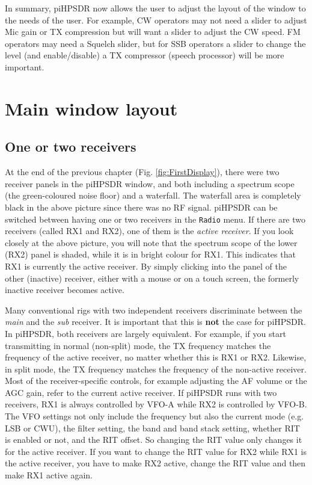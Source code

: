 \documentclass[12pt]{book}
\def\bltt#1{\texttt{\color{blue}#1}}
\def\pH{pi\-HPSDR\xspace}
\begin{document}
In summary, \pH now allows the user to adjust the layout of the window to the needs of the user.
For example, CW operators
may not need a slider to adjust Mic gain or TX compression but will want a slider to adjust the CW
speed. FM operators may need a Squelch slider, but for SSB operators a slider to change the
level (and enable/disable) a TX compressor (speech processor) will be more important.

\chapter{Main window layout}

\section{One or two receivers}
At the end of the previous chapter (Fig. \ref{fig:FirstDisplay}),
there were two receiver panels in the
\pH window, and both including a spectrum scope
(the green-coloured noise floor) and a waterfall. The waterfall area
is completely black in the above picture since there was no RF signal.
\pH can be switched between having one or two receivers in the
\bltt{Radio} menu. If there are two receivers (called RX1 and RX2),
one of them is the \textit{active receiver}. If you look closely
at the above picture, you will note that the spectrum scope of
the lower (RX2) panel is shaded, while it is in bright colour for RX1.
This indicates that RX1 is currently the active receiver. By simply
clicking into the panel of the other (inactive) receiver, either with
a mouse or on a touch screen, the formerly inactive receiver becomes
active.

Many conventional rigs with two independent receivers discriminate
between the \textit{main} and the \textit{sub} receiver. It is important that
this is \textbf{not} the case for \pH. In \pH, both  receivers are
largely equivalent. For example, if you start transmitting in
normal (non-split) mode, the TX frequency matches the frequency
of the active receiver, no matter whether this is RX1 or RX2.
Likewise, in split mode, the TX frequency matches the frequency
of the non-active receiver. Most of the receiver-specific controls,
for example adjusting the AF volume or the AGC gain, refer to the
current active receiver. If \pH runs with two receivers,
RX1 is always controlled by VFO-A while RX2 is controlled by VFO-B.
The VFO settings not only include the frequency but also the
current mode (e.g. LSB or CWU), the filter setting, the band and
band stack setting, whether RIT is enabled or not, and the RIT
offset. So changing the RIT value only changes it for the active
receiver. If you want  to change the RIT value for RX2 while RX1 is
the active receiver, you have to make RX2 active, change the RIT
value and then make RX1 active again.
\end{document}

